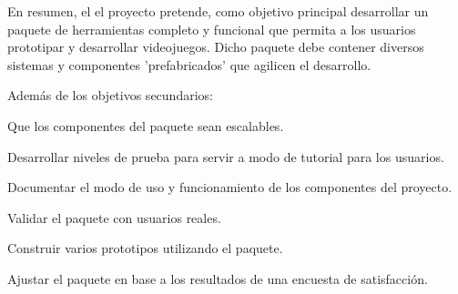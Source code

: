 En resumen, el el proyecto pretende, como objetivo principal desarrollar un paquete de herramientas completo y funcional que permita a los usuarios prototipar y 
 desarrollar videojuegos. Dicho paquete debe contener diversos sistemas y componentes 'prefabricados' que agilicen el desarrollo. 

Además de los objetivos secundarios:
\begin{compactitem}
  \item Que los componentes del paquete sean escalables.
  \item Desarrollar niveles de prueba para servir a modo de tutorial para los usuarios.
  \item Documentar el modo de uso y funcionamiento de los componentes del proyecto.
  \item Validar el paquete con usuarios reales.
  \item Construir varios prototipos utilizando el paquete.
  \item Ajustar el paquete en base a los resultados de una encuesta de satisfacción.
\end{compactitem}